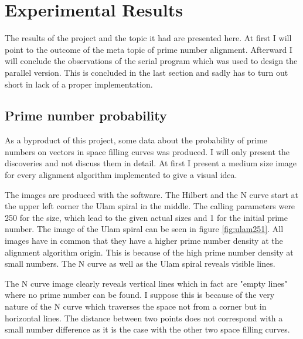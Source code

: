 \section{Experimental Results}
\label{sec:results}
The results of the project and the topic it had are presented here. At first I will point to the outcome of the meta topic of prime number alignment. Afterward I will conclude the observations of the serial program which was used to design the parallel version. This is concluded in the last section and sadly has to turn out short in lack of a proper implementation.

\subsection{Prime number probability}
\label{sec:resprob}
As a byproduct of this project, some data about the probability of prime numbers on vectors in space filling curves was produced. I will only present the discoveries and not discuss them in detail. At first I present a medium size image for every alignment algorithm implemented to give a visual idea.
\begin{figure}[H]
\begin{minipage}[t]{0.475\textwidth}
\centering
\end{minipage}
\hfill
\begin{minipage}[t]{0.475\textwidth}
\centering
\end{minipage}
\end{figure}
The images are produced with the software. The Hilbert and the N curve start at the upper left corner the Ulam spiral in the middle. The calling parameters were 250 for the size, which lead to the given actual sizes and 1 for the initial prime number. The image of the Ulam spiral can be seen in figure \ref{fig:ulam251}. All images have in common that they have a higher prime number density at the alignment algorithm origin. This is because of the high prime number density at small numbers. The N curve as well as the Ulam spiral reveals visible lines.

The N curve image clearly reveals vertical lines which in fact are "empty lines" where no prime number can be found. I suppose this is because of the very nature of the N curve which traverses the space not from a corner but in horizontal lines. The distance between two points does not correspond with a small number difference as it is the case with the other two space filling curves.

